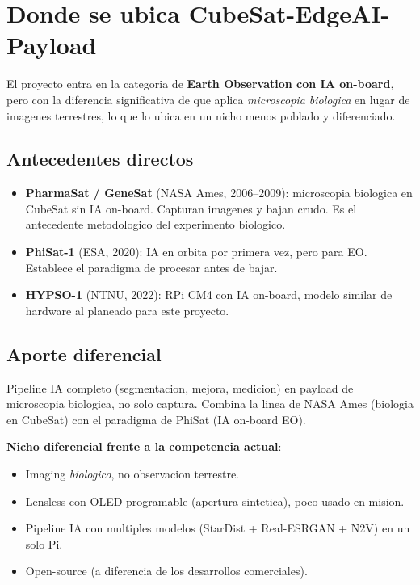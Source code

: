 \documentclass[11pt,a4paper,oneside]{report}
\begin{document}
\chapter{Donde se ubica CubeSat-EdgeAI-Payload}

El proyecto entra en la categoria de \textbf{Earth Observation con IA
on-board}, pero con la diferencia significativa de que aplica
\emph{microscopia biologica} en lugar de imagenes terrestres, lo que lo
ubica en un nicho menos poblado y diferenciado.

\section{Antecedentes directos}

\begin{itemize}[leftmargin=2em]
  \item \textbf{PharmaSat / GeneSat} (NASA Ames, 2006--2009): microscopia
        biologica en CubeSat sin IA on-board. Capturan imagenes y bajan
        crudo. Es el antecedente metodologico del experimento biologico.
  \item \textbf{PhiSat-1} (ESA, 2020): IA en orbita por primera vez, pero
        para EO. Establece el paradigma de procesar antes de bajar.
  \item \textbf{HYPSO-1} (NTNU, 2022): RPi CM4 con IA on-board, modelo
        similar de hardware al planeado para este proyecto.
\end{itemize}

\section{Aporte diferencial}

Pipeline IA completo (segmentacion, mejora, medicion) en payload de
microscopia biologica, no solo captura. Combina la linea de NASA Ames
(biologia en CubeSat) con el paradigma de PhiSat (IA on-board EO).

\begin{nicho}
\textbf{Nicho diferencial frente a la competencia actual}:
\begin{itemize}[leftmargin=1.5em]
  \item Imaging \emph{biologico}, no observacion terrestre.
  \item Lensless con OLED programable (apertura sintetica), poco usado en mision.
  \item Pipeline IA con multiples modelos (StarDist + Real-ESRGAN + N2V) en un solo Pi.
  \item Open-source (a diferencia de los desarrollos comerciales).
\end{itemize}
\end{nicho}
\end{document}
